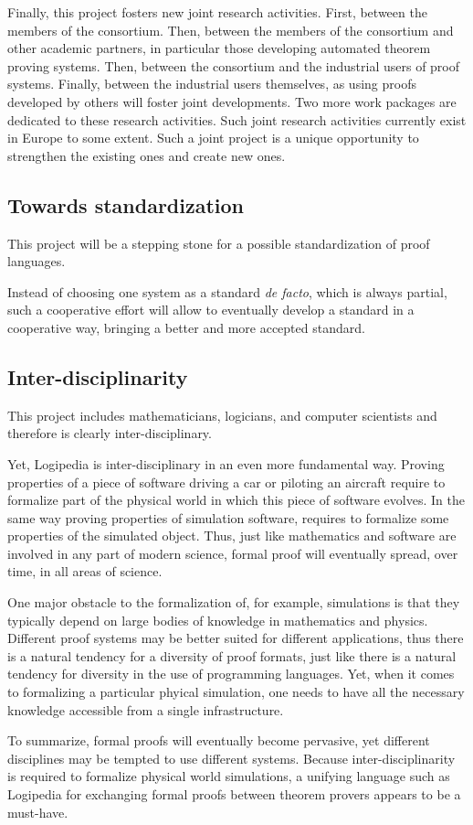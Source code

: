 Finally, this project fosters new joint research activities. First,
between the members of the consortium. Then, between the members of
the consortium and other academic partners, in particular those
developing automated theorem proving systems. Then, between the
consortium and the industrial users of proof systems. Finally, between
the industrial users themselves, as using proofs developed by others
will foster joint developments. Two more work packages are dedicated
to these research activities.  Such joint research activities
currently exist in Europe to some extent.  Such a joint project is a
unique opportunity to strengthen the existing ones and create new
ones.

\subsection{Towards standardization}

This project will be a stepping stone for a possible standardization
of proof languages. 

Instead of choosing one system as a standard {\em de facto}, which is
always partial, such a cooperative effort will allow to eventually
develop a standard in a cooperative way, bringing a better and more
accepted standard.

\subsection{Inter-disciplinarity}
This project includes mathematicians, logicians, and computer
scientists and therefore is clearly inter-disciplinary.

Yet, Logipedia is inter-disciplinary in an even more fundamental
way. Proving properties of a piece of software driving a car or
piloting an aircraft require to formalize part of the physical world
in which this piece of software evolves. In the same way proving
properties of simulation software, requires to formalize some
properties of the simulated object.  Thus, just like mathematics and
software are involved in any part of modern science, formal proof will
eventually spread, over time, in all areas of science. 

One major obstacle to the formalization of, for example, simulations
is that they typically depend on large bodies of knowledge in
mathematics and physics.  Different proof systems may be better
suited for different applications, thus there is a natural tendency
for a diversity of proof formats, just like there is a natural
tendency for diversity in the use of programming languages.  Yet, when
it comes to formalizing a particular phyical simulation, one needs to
have all the necessary knowledge accessible from a single infrastructure.

To summarize, formal proofs will eventually become pervasive, yet
different disciplines may be tempted to use different systems.
Because inter-disciplinarity is required to formalize physical world
simulations, a unifying language such as Logipedia for exchanging
formal proofs between theorem provers appears to be a must-have.

